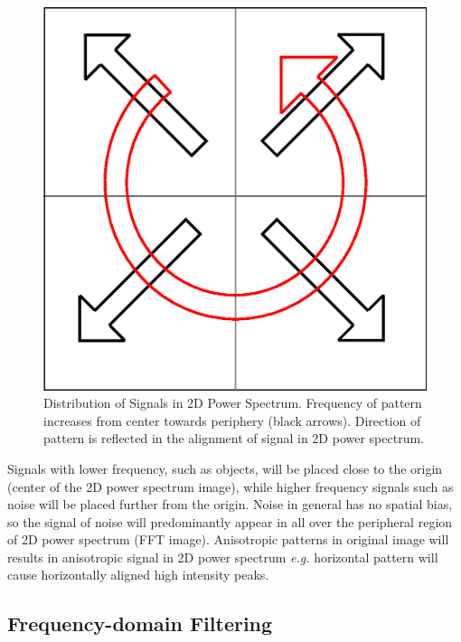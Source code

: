 \begin{figure}[H]
\begin{center}
\includegraphics{eps/FFTscheme.eps}
\caption{ Distribution of Signals in 2D Power Spectrum. Frequency of pattern increases from center towards periphery (black arrows). Direction of pattern is reflected in the alignment of signal in 2D power spectrum.}
\label{fig:imgFFT}
\end{center}
\end{figure}

Signals with lower frequency, such as objects, will be placed close to
the origin (center of the 2D power spectrum image), while higher frequency signals
such as noise will be placed further from the origin. Noise in general has no spatial bias, so the signal of noise will predominantly appear in all over the peripheral region of 2D power spectrum (FFT image). 
Anisotropic patterns in original image will results in anisotropic signal in 2D power spectrum \textit{e.g.} horizontal pattern will cause horizontally aligned high intensity peaks. 

\subsection{Frequency-domain Filtering}

